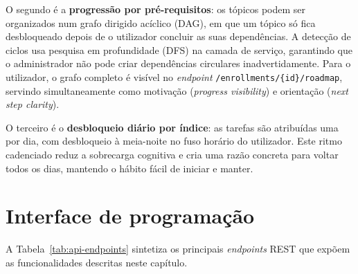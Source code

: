 O segundo \'e a \textbf{progress\~ao por pr\'e-requisitos}: os t\'opicos
podem ser organizados num grafo dirigido ac\'iclico (DAG), em que um t\'opico
s\'o fica desbloqueado depois de o utilizador concluir as suas depend\^encias.
A detec\c{c}\~ao de ciclos usa pesquisa em profundidade (DFS) na camada de servi\c{c}o,
garantindo que o administrador n\~ao pode criar depend\^encias circulares
inadvertidamente. Para o utilizador, o grafo completo \'e vis\'ivel no
\emph{endpoint} \texttt{/enrollments/\{id\}/roadmap}, servindo simultaneamente
como motiva\c{c}\~ao (\emph{progress visibility}) e orienta\c{c}\~ao
(\emph{next step clarity}).

O terceiro \'e o \textbf{desbloqueio di\'ario por \'indice}: as tarefas s\~ao
atribu\'idas uma por dia, com desbloqueio \`a meia-noite no fuso hor\'ario do
utilizador. Este ritmo cadenciado reduz a sobrecarga cognitiva e cria uma
raz\~ao concreta para voltar todos os dias, mantendo o h\'abito f\'acil de
iniciar e manter.

\section{Interface de programa\c{c}\~ao}
\label{sec:api}

A Tabela~\ref{tab:api-endpoints} sintetiza os principais \emph{endpoints}
REST que exp\~oem as funcionalidades descritas neste cap\'itulo.

